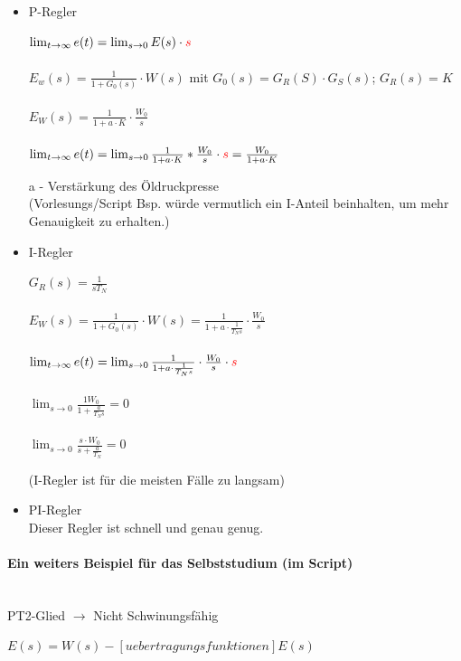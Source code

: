 \documentclass{article}
\begin{document}
\begin{itemize}
	\item P-Regler
	\begin{center}
	$\lim_{t \to \infty} e(t) = \lim_{s \to 0} E(s) \cdot \textcolor{red}{s}$ \\ \mbox{} \\
	$E_w(s) = \frac{1}{1+G_0(s)} \cdot W(s)$ mit $G_0(s) = G_R(S) \cdot G_S(s)$; $G_R(s) = K$ \\ \mbox{} \\
	$E_W(s) = \frac{1}{1+a \cdot K} \cdot \frac{W_0}{s}$ \\ \mbox{} \\
	$\lim_{t \to \infty} e(t) = \lim_{s \to 0} \frac{1}{1+a \cdot K} * \frac{W_0}{s} \cdot \textcolor{red}{s} = \frac{W_0}{1+a \cdot K}$
	\end{center}
	a - Verstärkung des Öldruckpresse\\
	(Vorlesungs/Script Bsp. würde vermutlich ein I-Anteil beinhalten, um mehr Genauigkeit zu erhalten.)

	\item I-Regler
	\begin{center}
	$G_R(s) = \frac{1}{sT_N}$ \\ \mbox{} \\
	$E_W(s) = \frac{1}{1+G_0(s)} \cdot W(s) = \frac{1}{1+a \cdot \frac{1}{T_Ns}} \cdot \frac{W_0}{s}$ \\ \mbox{} \\
	$\lim_{t \to \infty} e(t) = \lim_{s \to 0} \frac{1}{1+a \cdot \frac{1}{T_Ns}} \cdot \frac{W_0}{s} \cdot \textcolor{red}{s}$ \\ \mbox{} \\
	$\lim_{s \to 0} \frac{1 W_0}{1 + \frac{a}{T_Ns}} = 0$ \\ \mbox{} \\
	$\lim_{s \to 0} \frac{s \cdot W_0}{s + \frac{a}{T_N}} = 0$
	\end{center}
	(I-Regler ist für die meisten Fälle zu langsam)
	
	\item PI-Regler \\
	Dieser Regler ist schnell und genau genug.
\end{itemize}

\paragraph{Ein weiters Beispiel für das Selbststudium (im Script)} \mbox{} \\
PT2-Glied $\to$ Nicht Schwinungsfähig
\begin{center}
	$E(s) = W(s) - [uebertragungsfunktionen] E(s)$
\end{center}
\end{document}
